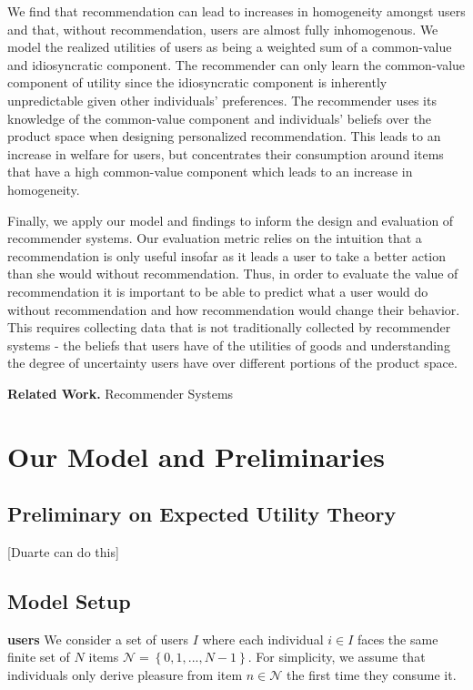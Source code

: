 \documentclass[sigconf]{acmart}
\begin{document}
We find that recommendation can lead to increases in homogeneity amongst users and that, without recommendation, users are almost fully inhomogenous. We model the realized utilities of users as being a weighted sum of a common-value and idiosyncratic component. The recommender can only learn the common-value component of utility since the idiosyncratic component is inherently unpredictable given other individuals' preferences. The recommender uses its knowledge of the common-value component and individuals' beliefs over the product space when designing personalized recommendation. This leads to an increase in welfare for users, but concentrates their consumption around items that have a high common-value component which leads to an increase in homogeneity.

Finally, we apply our model and findings to inform the design and evaluation of recommender systems. Our evaluation metric relies on the intuition that a recommendation is only useful insofar as it leads a user to take a better action than she would without recommendation. Thus, in order to evaluate the value of recommendation it is important to be able to predict what a user would do without recommendation and how recommendation would change their behavior. This requires collecting data that is not traditionally collected by recommender systems - the beliefs that users have of the utilities of goods and understanding the degree of uncertainty users have over different portions of the product space.

\textbf{Related Work.}
Recommender Systems

\section{Our Model and Preliminaries}

\subsection{Preliminary on Expected Utility Theory}
[Duarte can do this]

\subsection{Model Setup}
\par
\noindent \textbf{users} We consider a set of users $I$ where each individual $i \in I$ faces the same finite set of $N$ items $\mathcal{N} = \left\{0,1,...,N-1\right\}$. For simplicity, we assume that individuals only derive pleasure from item $n \in \mathcal{N}$ the first time they consume it.
\end{document}
